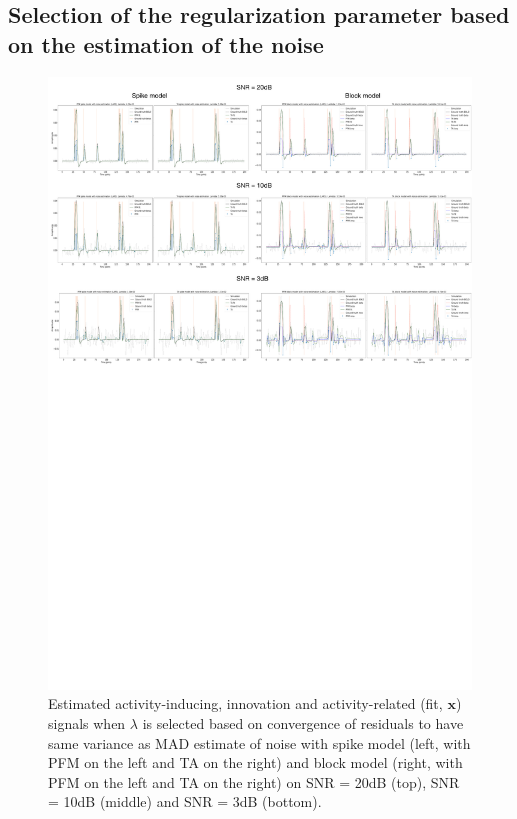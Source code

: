 \subsection{Selection of the regularization parameter based on the estimation of the noise}

\begin{figure}[t!]
    \begin{center}
        \includegraphics[width=\textwidth]{figures/std_based.pdf}
    \end{center}
    \caption{Estimated activity-inducing, innovation and activity-related (fit, \(\mathbf{x}\)) signals when \(\lambda\) is selected based on convergence of residuals to have same variance as MAD estimate of noise with spike model (left, with PFM on the left and TA on the right) and block model (right, with PFM on the left and TA on the right) on SNR = 20dB (top), SNR = 10dB (middle) and SNR = 3dB (bottom).}
\label{fig:std}
\end{figure}


